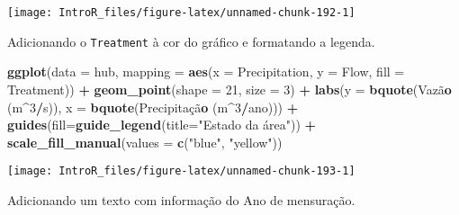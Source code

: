 \documentclass[
]{book}
\newenvironment{Shaded}{\begin{snugshade}}{\end{snugshade}}
\newcommand{\DataTypeTok}[1]{\textcolor[rgb]{0.13,0.29,0.53}{#1}}
\newcommand{\DecValTok}[1]{\textcolor[rgb]{0.00,0.00,0.81}{#1}}
\newcommand{\KeywordTok}[1]{\textcolor[rgb]{0.13,0.29,0.53}{\textbf{#1}}}
\newcommand{\NormalTok}[1]{#1}
\newcommand{\OperatorTok}[1]{\textcolor[rgb]{0.81,0.36,0.00}{\textbf{#1}}}
\newcommand{\StringTok}[1]{\textcolor[rgb]{0.31,0.60,0.02}{#1}}
\begin{document}
\begin{center}\texttt{[image: IntroR\_files/figure-latex/unnamed-chunk-192-1]} \end{center}

Adicionando o \texttt{Treatment} à cor do gráfico e formatando a legenda.

\begin{Shaded}
\begin{Highlighting}[]
\KeywordTok{ggplot}\NormalTok{(}\DataTypeTok{data =}\NormalTok{ hub, }\DataTypeTok{mapping =} \KeywordTok{aes}\NormalTok{(}\DataTypeTok{x =}\NormalTok{ Precipitation, }\DataTypeTok{y =}\NormalTok{ Flow, }\DataTypeTok{fill =}\NormalTok{ Treatment)) }\OperatorTok{+}
\StringTok{  }\KeywordTok{geom_point}\NormalTok{(}\DataTypeTok{shape =} \DecValTok{21}\NormalTok{, }\DataTypeTok{size =} \DecValTok{3}\NormalTok{) }\OperatorTok{+}
\StringTok{  }\KeywordTok{labs}\NormalTok{(}\DataTypeTok{y =} \KeywordTok{bquote}\NormalTok{(Vazã}\KeywordTok{o}\NormalTok{ (m}\OperatorTok{^}\DecValTok{3}\OperatorTok{/}\NormalTok{s)),}
       \DataTypeTok{x =} \KeywordTok{bquote}\NormalTok{(Precipitaçã}\KeywordTok{o}\NormalTok{ (m}\OperatorTok{^}\DecValTok{3}\OperatorTok{/}\NormalTok{ano))) }\OperatorTok{+}
\StringTok{  }\KeywordTok{guides}\NormalTok{(}\DataTypeTok{fill=}\KeywordTok{guide_legend}\NormalTok{(}\DataTypeTok{title=}\StringTok{"Estado da área"}\NormalTok{)) }\OperatorTok{+}
\StringTok{  }\KeywordTok{scale_fill_manual}\NormalTok{(}\DataTypeTok{values =} \KeywordTok{c}\NormalTok{(}\StringTok{"blue"}\NormalTok{, }\StringTok{"yellow"}\NormalTok{))}
\end{Highlighting}
\end{Shaded}

\begin{center}\texttt{[image: IntroR\_files/figure-latex/unnamed-chunk-193-1]} \end{center}

Adicionando um texto com informação do Ano de mensuração.
\end{document}

